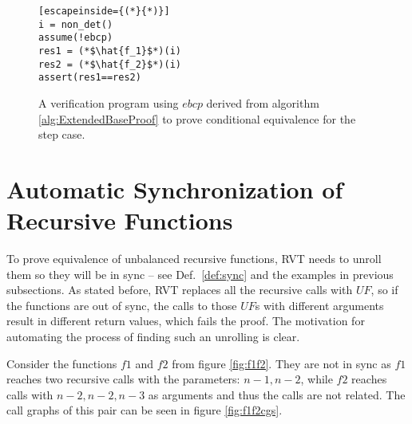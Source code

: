 \begin{figure} [h]
\begin{center}
\begin{minipage}{7 cm}
\begin{lstlisting}[escapeinside={(*}{*)}]
i = non_det()
assume(!ebcp)
res1 = (*$\hat{f_1}$*)(i)
res2 = (*$\hat{f_2}$*)(i)
assert(res1==res2)
\end{lstlisting}
\end{minipage}
\caption{A verification program using $ebcp$ derived from algorithm \ref{alg:ExtendedBaseProof} to prove conditional equivalence for the step case.}
\label{fig:stepvefprogram}
\end{center}
\end{figure}

\section{Automatic Synchronization of Recursive Functions}
To prove equivalence of unbalanced recursive functions, RVT needs to unroll them so they will be in sync -- see Def.~\ref{def:sync} and the examples in previous subsections. As stated before, RVT replaces all the recursive calls with $UF$, so if the functions are out of sync, the calls to those $UF$s with different arguments result in different return values, which fails the proof. The motivation for automating the process of finding such an unrolling is clear. 

Consider the functions $f1$ and $f2$ from figure \ref{fig:f1f2}.
They are not in sync as $f1$ reaches two recursive calls with the parameters: $n-1,n-2$, while $f2$ reaches calls with $n-2,n-2,n-3$ as arguments and thus the calls are not related.
The call graphs of this pair can be seen in figure \ref{fig:f1f2cgs}.

